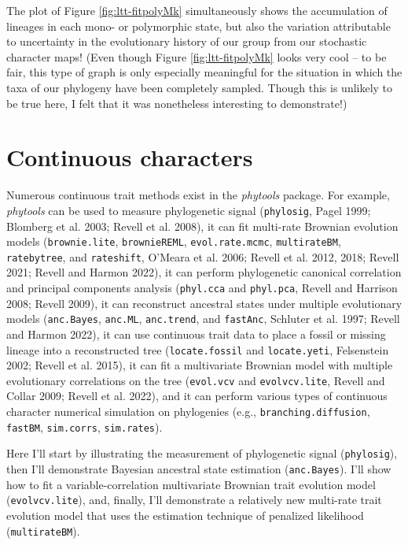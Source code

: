 \documentclass[fleqn,10pt,lineno]{wlpeerj} %
\begin{document}
The plot of Figure \ref{fig:ltt-fitpolyMk} simultaneously shows the accumulation of lineages in each mono- or polymorphic state, but also the variation attributable to uncertainty in the evolutionary history of our group from our stochastic character maps! (Even though Figure \ref{fig:ltt-fitpolyMk} looks very cool -- to be fair, this type of graph is only especially meaningful for the situation in which the taxa of our phylogeny have been completely sampled. Though this is unlikely to be true here, I felt that it was nonetheless interesting to demonstrate!)

\hypertarget{continuous-characters}{%
\section{Continuous characters}\label{continuous-characters}}

Numerous continuous trait methods exist in the \emph{phytools} package. For example, \emph{phytools} can be used to measure phylogenetic signal (\texttt{phylosig}, Pagel 1999; Blomberg et al. 2003; Revell et al. 2008), it can fit multi-rate Brownian evolution models (\texttt{brownie.lite}, \texttt{brownieREML}, \texttt{evol.rate.mcmc}, \texttt{multirateBM}, \texttt{ratebytree}, and \texttt{rateshift}, O'Meara et al. 2006; Revell et al. 2012, 2018; Revell 2021; Revell and Harmon 2022), it can perform phylogenetic canonical correlation and principal components analysis (\texttt{phyl.cca} and \texttt{phyl.pca}, Revell and Harrison 2008; Revell 2009), it can reconstruct ancestral states under multiple evolutionary models (\texttt{anc.Bayes}, \texttt{anc.ML}, \texttt{anc.trend}, and \texttt{fastAnc}, Schluter et al. 1997; Revell and Harmon 2022), it can use continuous trait data to place a fossil or missing lineage into a reconstructed tree (\texttt{locate.fossil} and \texttt{locate.yeti}, Felsenstein 2002; Revell et al. 2015), it can fit a multivariate Brownian model with multiple evolutionary correlations on the tree (\texttt{evol.vcv} and \texttt{evolvcv.lite}, Revell and Collar 2009; Revell et al. 2022), and it can perform various types of continuous character numerical simulation on phylogenies (e.g., \texttt{branching.diffusion}, \texttt{fastBM}, \texttt{sim.corrs}, \texttt{sim.rates}).

Here I'll start by illustrating the measurement of phylogenetic signal (\texttt{phylosig}), then I'll demonstrate Bayesian ancestral state estimation (\texttt{anc.Bayes}). I'll show how to fit a variable-correlation multivariate Brownian trait evolution model (\texttt{evolvcv.lite}), and, finally, I'll demonstrate a relatively new multi-rate trait evolution model that uses the estimation technique of penalized likelihood (\texttt{multirateBM}).
\end{document}
